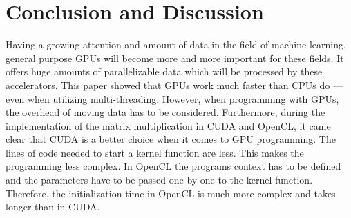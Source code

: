 \section{Conclusion and Discussion}
Having a growing attention and amount of data in the field of machine learning, general purpose GPUs will become more and more important for these fields.
It offers huge amounts of parallelizable data which will be processed by these accelerators.
This paper showed that GPUs work much faster than CPUs do --- even when utilizing multi-threading.
However, when programming with GPUs, the overhead of moving data has to be considered.
Furthermore, during the implementation of the matrix multiplication in CUDA and OpenCL, it came clear that CUDA is a better choice when it comes to GPU programming.
The lines of code needed to start a kernel function are less.
This makes the programming less complex.
In OpenCL the programs context has to be defined and the parameters have to be passed one by one to the kernel function.
Therefore, the initialization time in OpenCL is much more complex and takes longer than in CUDA.